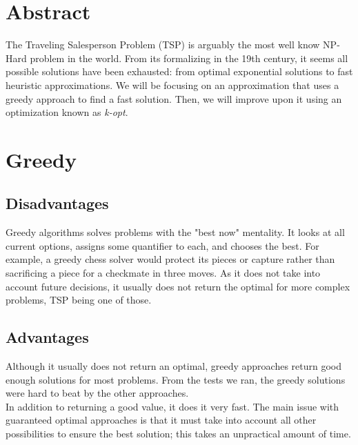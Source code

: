 \documentclass[12pt]{report}
\begin{document}
\begin{multicols}{2}

    \section{Abstract}
    The Traveling Salesperson Problem (TSP) is arguably the most well know NP-Hard problem in the world. From its formalizing in the 19th century, it seems all possible solutions have been exhausted: from optimal exponential solutions to fast heuristic approximations. We will be focusing on an approximation that uses a greedy approach to find a fast solution. Then, we will improve upon it using an optimization known as \textit{k-opt}.

    \section{Greedy}
    \subsection{Disadvantages}
    Greedy algorithms solves problems with the "best now" mentality. It looks at all current options, assigns some quantifier to each, and chooses the best. For example, a greedy chess solver would protect its pieces or capture rather than sacrificing a piece for a checkmate in three moves. As it does not take into account future decisions, it usually does not return the optimal for more complex problems, TSP being one of those. \\
    \subsection{Advantages}
    Although it usually does not return an optimal, greedy approaches return good enough solutions for most problems. From the tests we ran, the greedy solutions were hard to beat by the other approaches.\\

    In addition to returning a good value, it does it very fast. The main issue with guaranteed optimal approaches is that it must take into account all other possibilities to ensure the best solution; this takes an unpractical amount of time.


\end{multicols}
\end{document}
